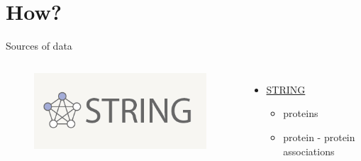 \documentclass{beamer}
\begin{document}

\section{How?}
\begin{frame}{Sources of data}
\begin{columns}[c] %

\begin{figure}
    \centering
    \includegraphics[width=1\linewidth]{string_logo.png}
\end{figure}
\begin{itemize}
    \item \href{https://string-db.org/}{STRING}
    \begin{itemize}
        \item proteins
        \item protein - protein associations
    \end{itemize}
\end{itemize}


\end{columns}
\end{frame}
\end{document}
